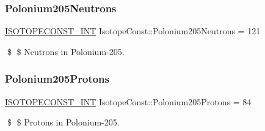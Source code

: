 \subsubsection{\texorpdfstring{Polonium205\+Neutrons}{Polonium205Neutrons}}
{\footnotesize\ttfamily \mbox{\hyperlink{group___isotope_const-_macros_ga5f18360b3e99483a35c32d789e62621c}{I\+S\+O\+T\+O\+P\+E\+C\+O\+N\+S\+T\+\_\+\+I\+NT}} Isotope\+Const\+::\+Polonium205\+Neutrons = 121}

\$ \$ Neutrons in Polonium-\/205. \mbox{\label{group___isotope_const-_polonium-_po205_ga9b2cd17778d8375b2ac9630536035e9d}} 
\subsubsection{\texorpdfstring{Polonium205\+Protons}{Polonium205Protons}}
{\footnotesize\ttfamily \mbox{\hyperlink{group___isotope_const-_macros_ga5f18360b3e99483a35c32d789e62621c}{I\+S\+O\+T\+O\+P\+E\+C\+O\+N\+S\+T\+\_\+\+I\+NT}} Isotope\+Const\+::\+Polonium205\+Protons = 84}

\$ \$ Protons in Polonium-\/205. 